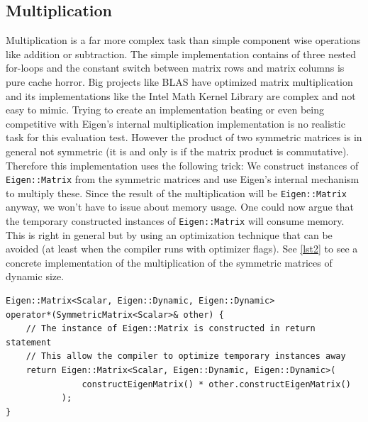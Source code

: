 \documentclass[a4wide]{scrartcl}
\begin{document}
\subsection{Multiplication}
Multiplication is a far more complex task than simple component wise operations like addition or subtraction. The simple implementation contains of three nested for-loops and the constant switch between matrix rows and matrix columns is pure cache horror. Big projects like BLAS have optimized matrix multiplication and its implementations like the Intel Math Kernel Library are complex and not easy to mimic. Trying to create an implementation beating or even being competitive with Eigen's internal multiplication implementation is no realistic task for this evaluation test.\newline
However the product of two symmetric matrices is in general not symmetric (it is and only is if the matrix product is commutative). Therefore this implementation uses the following trick: We construct instances of \texttt{Eigen::Matrix} from the symmetric matrices and use Eigen's internal mechanism to multiply these. Since the result of the multiplication will be \texttt{Eigen::Matrix} anyway, we won't have to issue about memory usage.\newline
One could now argue that the temporary constructed instances of \texttt{Eigen::Matrix} will consume memory. This is right in general but by using an optimization technique that can be avoided (at least when the compiler runs with optimizer flags). See \autoref{lst2} to see a concrete implementation of the multiplication of the symmetric matrices of dynamic size.
\begin{table}
\begin{lstlisting}[caption={Overloaded operator $*$ for the multiplication of two dynamically sized matrices.},label=lst2]
Eigen::Matrix<Scalar, Eigen::Dynamic, Eigen::Dynamic>
operator*(SymmetricMatrix<Scalar>& other) {
    // The instance of Eigen::Matrix is constructed in return statement
    // This allow the compiler to optimize temporary instances away
    return Eigen::Matrix<Scalar, Eigen::Dynamic, Eigen::Dynamic>(
               constructEigenMatrix() * other.constructEigenMatrix()
           );
}
\end{lstlisting}
\end{table}
\end{document}
